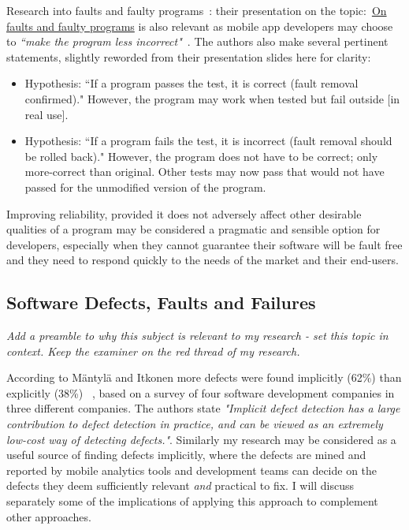 Research into faults and faulty programs~: their presentation on the topic:~\href{http://mathcs.chapman.edu/ramics2014/slides/MiliFriasJaouaRAMiCS2014.pdf}{On faults and faulty programs} is also relevant as mobile app developers may choose to \emph{``make the program less incorrect"}~. The authors also make several pertinent statements, slightly reworded from their presentation slides here for clarity:
\begin{itemize}
    \item Hypothesis: ``If a program passes the test, it is correct (fault removal confirmed)." However, the program may work when tested but fail outside [in real use].
    \item Hypothesis: ``If a program fails the test, it is incorrect (fault removal should be rolled back)." However, the program does not have to be correct; only more-correct than original. Other tests may now pass that would not have passed for the unmodified version of the program.
\end{itemize}

Improving reliability, provided it does not adversely affect other desirable qualities of a program may be considered a pragmatic and sensible option for developers, especially when they cannot guarantee their software will be fault free and they need to respond quickly to the needs of the market and their end-users.



\hypertarget{defects.faults.failures}{}
\subsection{Software Defects, Faults and Failures}
\emph{Add a preamble to why this subject is relevant to my research - set this topic in context. Keep the examiner on the red thread of my research.}


According to Mäntylä and Itkonen more defects were found implicitly (62\%) than explicitly (38\%) ~, based on a survey of four software development companies in three different companies. The authors state \emph{"Implicit defect detection has a large contribution to defect detection in practice, and can be viewed as
an extremely low-cost way of detecting defects."}. Similarly my research may be considered as a useful source of finding defects implicitly, where the defects are mined and reported by mobile analytics tools and development teams can decide on the defects they deem sufficiently relevant \emph{and} practical to fix. I will discuss separately some of the implications of applying this approach to complement other approaches.

